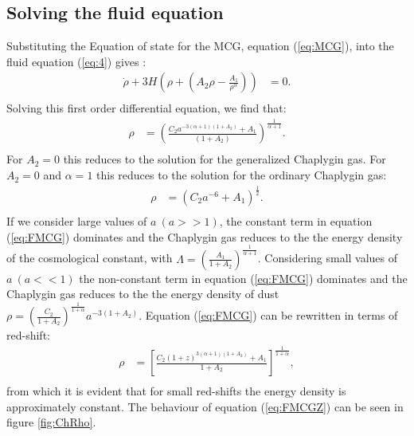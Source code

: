 \documentclass[a4paper, 11pt]{FSKH_623_Report}
\numberwithin{equation}{section}
\newcommand{\brac}[1]{\left(#1\right)}
\newcommand{\bracc}[1]{\left[#1\right]}
\begin{document}
\subsection*{Solving the fluid equation}
Substituting the Equation of state for the MCG, equation (\ref{eq:MCG}), into the fluid equation (\ref{eq:4}) gives :
\begin{equation}\label{eq:FMCG0}
\begin{split}
\dot{\rho}+3H\brac{\rho+\brac{A_{2}\rho-\frac{A_{1}}{\rho^{\alpha}}}} &= 0. \\
\end{split}
\end{equation}
Solving this first order differential equation, we find that:
\begin{equation}\label{eq:FMCG}
\begin{split}
\rho&=\brac{\frac{C_{2}a^{-3\brac{\alpha+1}\brac{1+A_{2}}}+A_{1}}{\brac{1+A_{2}}}}^{\frac{1}{\alpha+1}}.\\ 
\end{split} 
\end{equation} 
For $A_{2}=0$ this reduces to the solution for the generalized Chaplygin gas. For $A_{2}=0$ and $\alpha=1$ this reduces to the solution for the ordinary Chaplygin gas:
\begin{equation}\label{eq:OCGRH}
\begin{split}
\rho&=\brac{C_{2}a^{-6}+A_{1}}^{\frac{1}{2}}.\\
\end{split}
\end{equation}
If we consider large values of $a\ \brac{a>>1}$, the constant term in equation (\ref{eq:FMCG}) dominates and the Chaplygin gas reduces to the the energy density of the cosmological constant, with $\Lambda=\brac{\frac{A_{1}}{1+A_{2}}}^{\frac{1}{\alpha+1}}$. Considering small values of $a\ \brac{a<<1}$ the non-constant term in equation (\ref{eq:FMCG}) dominates and the Chaplygin gas reduces to the the energy density of dust $\rho=\brac{\frac{C_{2}}{1+A_{2}}}^{\frac{1}{1+\alpha}}a^{-3(1+A_{2})}$. Equation (\ref{eq:FMCG}) can be rewritten in terms of red-shift:
\begin{equation}\label{eq:FMCGZ}
\begin{split}
\rho  &= \bracc{\frac{C_{2}\brac{1+z}^{3\brac{\alpha+1}\brac{1+A_{2}}}+A_{1}}{1+A_{2}}}^{\frac{1}{1+\alpha}},         \\
\end{split}
\end{equation}
from which it is evident that for small red-shifts the energy density is approximately constant. The behaviour of equation (\ref{eq:FMCGZ}) can be seen in figure \ref{fig:ChRho}.
	
\end{document}
